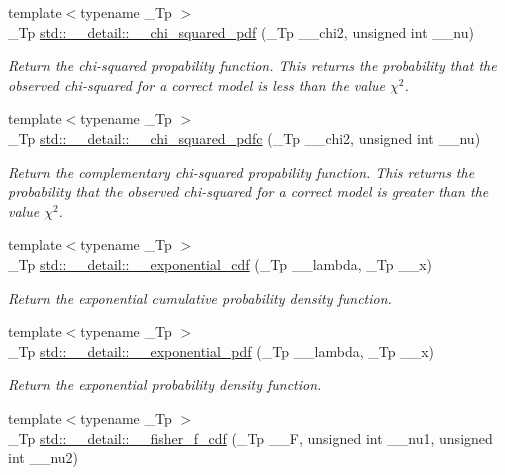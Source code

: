 \begin{DoxyCompactItemize}
{\footnotesize template$<$typename \+\_\+\+Tp $>$ }\\\+\_\+\+Tp \hyperlink{namespacestd_1_1____detail_a2125cbbc3fd3aad11c8025478c7a14fe}{std\+::\+\_\+\+\_\+detail\+::\+\_\+\+\_\+chi\+\_\+squared\+\_\+pdf} (\+\_\+\+Tp \+\_\+\+\_\+chi2, unsigned int \+\_\+\+\_\+nu)
\begin{DoxyCompactList}\small\item\em Return the chi-\/squared propability function. This returns the probability that the observed chi-\/squared for a correct model is less than the value $ \chi^2 $. \end{DoxyCompactList}\item 
{\footnotesize template$<$typename \+\_\+\+Tp $>$ }\\\+\_\+\+Tp \hyperlink{namespacestd_1_1____detail_aa62c16dd75a7411400c7082e6b2b246b}{std\+::\+\_\+\+\_\+detail\+::\+\_\+\+\_\+chi\+\_\+squared\+\_\+pdfc} (\+\_\+\+Tp \+\_\+\+\_\+chi2, unsigned int \+\_\+\+\_\+nu)
\begin{DoxyCompactList}\small\item\em Return the complementary chi-\/squared propability function. This returns the probability that the observed chi-\/squared for a correct model is greater than the value $ \chi^2 $. \end{DoxyCompactList}\item 
{\footnotesize template$<$typename \+\_\+\+Tp $>$ }\\\+\_\+\+Tp \hyperlink{namespacestd_1_1____detail_ada7f806f891a02d7825ec9a8862302ad}{std\+::\+\_\+\+\_\+detail\+::\+\_\+\+\_\+exponential\+\_\+cdf} (\+\_\+\+Tp \+\_\+\+\_\+lambda, \+\_\+\+Tp \+\_\+\+\_\+x)
\begin{DoxyCompactList}\small\item\em Return the exponential cumulative probability density function. \end{DoxyCompactList}\item 
{\footnotesize template$<$typename \+\_\+\+Tp $>$ }\\\+\_\+\+Tp \hyperlink{namespacestd_1_1____detail_add35fd0c4c00f412c0fab7b6018ce2cd}{std\+::\+\_\+\+\_\+detail\+::\+\_\+\+\_\+exponential\+\_\+pdf} (\+\_\+\+Tp \+\_\+\+\_\+lambda, \+\_\+\+Tp \+\_\+\+\_\+x)
\begin{DoxyCompactList}\small\item\em Return the exponential probability density function. \end{DoxyCompactList}\item 
{\footnotesize template$<$typename \+\_\+\+Tp $>$ }\\\+\_\+\+Tp \hyperlink{namespacestd_1_1____detail_a3825f4b63cdd255c1ca790bf16d844a1}{std\+::\+\_\+\+\_\+detail\+::\+\_\+\+\_\+fisher\+\_\+f\+\_\+cdf} (\+\_\+\+Tp \+\_\+\+\_\+F, unsigned int \+\_\+\+\_\+nu1, unsigned int \+\_\+\+\_\+nu2)

\end{DoxyCompactItemize}
